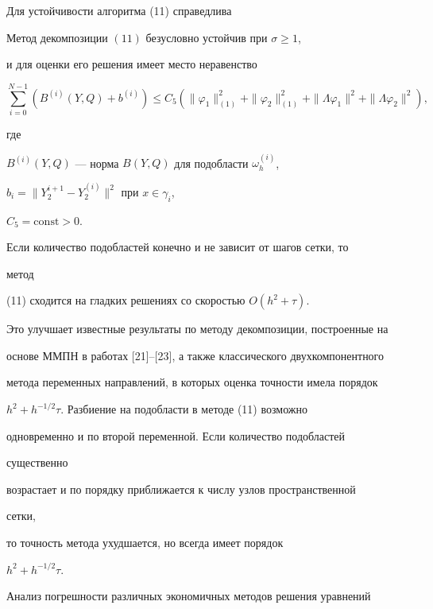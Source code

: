 Для устойчивости алгоритма (11) справедлива





\begin{thm}


Метод декомпозиции $(11)$ безусловно устойчив при $\sigma\geq 1$,


и для оценки его решения имеет место неравенство


$$


\sum_{i=0}^{N-1}(B^{(i)}(Y,Q)+b^{(i)})\leq C_5(\|\varphi_1\|_{(1)}^2+


\|\varphi_2\|_{(1)}^2+\|\Lambda\varphi_1\|^2+\|\Lambda\varphi_2\|^2),


$$


где


$B^{(i)}(Y,Q)$ --- норма $B(Y,Q)$ для подобласти $\omega_h^{(i)}$,


$b_i=\|Y_2^{i+1}-Y_2^{(i)}\|^2$ при $x\in\gamma_i$,


$C_5=\mathrm{const}>0.$


\end{thm}





Если количество подобластей конечно и не зависит от шагов сетки, то


метод


(11) сходится на гладких решениях со скоростью $O(h^2+\tau)$.


Это улучшает известные результаты по методу декомпозиции, построенные на


основе ММПН в работах [21]--[23], а также классического двухкомпонентного


метода переменных направлений, в которых оценка точности имела порядок


$h^2+h^{-1/2}\tau$. Разбиение на подобласти в методе (11) возможно


одновременно и по второй переменной. Если количество подобластей


существенно


возрастает и по порядку приближается к числу узлов пространственной


сетки,


то точность метода ухудшается, но всегда имеет порядок


$h^2+h^{-1/2}\tau$.





Анализ погрешности различных экономичных методов решения уравнений


